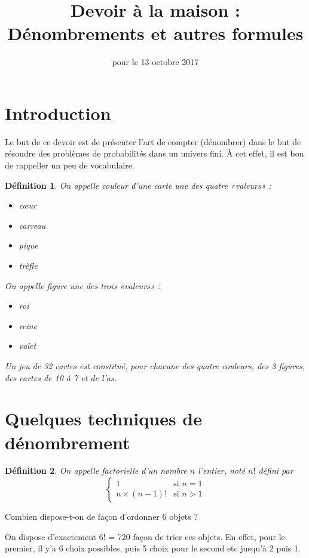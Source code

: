 \documentclass[12pt,a4paper,french]{article}
\title{Devoir à la maison \no{2} : Dénombrements et autres formules}
\author{\bsc{Ts 2}}
\date{pour le 13 octobre 2017}
\makeatletter
\renewcommand{\maketitle}%
{\framebox{%
    \begin{minipage}{1.0\linewidth}%
      \begin{center}%
        \Large \@title ~-- \@author \\%
        \@date%
      \end{center}%
    \end{minipage}}%
  \normalsize%
}
\theoremstyle{break}
\newtheorem{definition}{Définition}
\theoremstyle{plain}
\theoremstyle{nonumberplain}
\theoremstyle{nonumberbreak}
\makeatother
\begin{document}
\maketitle

\section*{Introduction}

Le but de ce devoir est de présenter l'art de compter (dénombrer) dans
le but de résoudre des problèmes de probabilités dans un univers fini. À
cet effet, il est bon de rappeller un peu de vocabulaire.

\begin{definition}
  On appelle \emph{couleur d'une carte} une des quatre «valeurs» :
  \begin{itemize}[label=--]
    \item cœur
    \item carreau
    \item pique
    \item trèfle
  \end{itemize}

  On appelle \emph{figure} une des trois «valeurs» :
  \begin{itemize}[label=--]
    \item roi
    \item reine
    \item valet
  \end{itemize}

  Un \emph{jeu de 32 cartes} est constitué, pour chacune des quatre
  couleurs, des 3 figures, des cartes de 10 à 7 et de l'as.
\end{definition}

\section{Quelques techniques de dénombrement}

\begin{definition}
  On appelle \emph{factorielle} d'un nombre $n$ l'entier, noté $n!$
  défini par \[ \left\lbrace\begin{matrix}1 & \text{si } n = 1 \\
  n\times (n - 1)! & \text{si } n > 1\end{matrix}\right. \]

\end{definition}

\begin{question}[ID=factorielle]
  Combien dispose-t-on de façon d'ordonner 6 objets ?
\end{question}
\begin{solution}
  On dispose d'exactement 6! = 720 façon de trier ces objets. En effet,
  pour le premier, il y'a 6 choix possibles, puis 5 choix pour le second
  etc jusqu'à 2 puis 1.
\end{solution}
\end{document}
